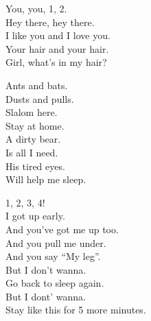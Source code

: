 
\label{ep:teenage-gizzard}




You, you, 1, 2. \\

Hey there, hey there. \\
I like you and I love you. \\
Your hair and your hair. \\

Girl, what's in my hair? \\




Ants and bats. \\
Dusts and pulls. \\
Slalom here. \\
Stay at home. \\

A dirty bear. \\
Is all I need. \\
His tired eyes. \\
Will help me sleep. \\




1, 2, 3, 4! \\

I got up early. \\
And you've got me up too. \\
And you pull me under. \\
And you say ``My leg''. \\
But I don't wanna. \\
Go back to sleep again. \\
But I dont' wanna. \\
Stay like this for 5 more minutes. \\

